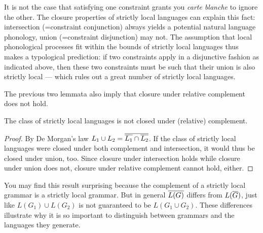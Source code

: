 It is not the case that satisfying one constraint grants you \emph{carte blanche} to ignore the other.
The closure properties of strictly local languages can explain this fact: intersection (=constraint conjunction) always yields a potential natural language phonology, union (=constraint disjunction) may not.
The assumption that local phonological processes fit within the bounds of strictly local languages thus makes a typological prediction: if two constraints apply in a disjunctive fashion as indicated above, then these two constraints must be such that their union is also strictly local --- which rules out a great number of strictly local languages.
%

The previous two lemmata also imply that closure under relative complement does not hold.
%
\begin{lemma}
    The class of strictly local languages is not closed under (relative) complement.
\end{lemma}
%
\begin{proof}
    By De Morgan's law $L_1 \cup L_2 =  \overline{ \overline{L_1}  \cap  \overline{L_2} } $.
    If the class of strictly local languages were closed under both complement and intersection, it would thus be closed under union, too.
    Since closure under intersection holds while closure under union does not, closure under relative complement cannot hold, either.
\end{proof}
%
You may find this result surprising because the complement of a strictly local grammar is a strictly local grammar.
But in general $ \overline{L(G)} $ differs from $L( \overline{G} )$, just like $L(G_1) \cup L(G_2)$ is not guaranteed to be $L(G_1 \cup G_2)$.
These differences illustrate why it is so important to distinguish between grammars and the languages they generate.

